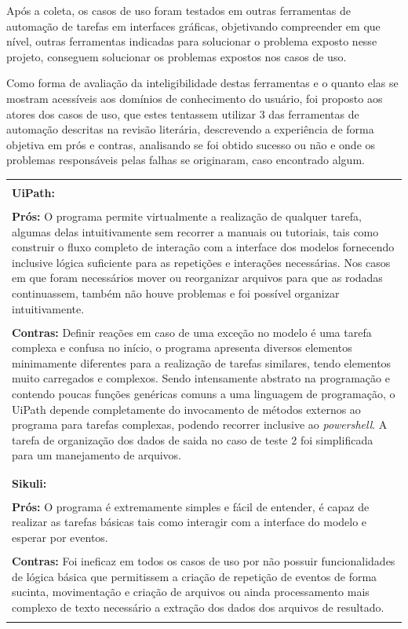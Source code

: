 \documentclass[tg]{mdtufsm}
\begin{document}
	Após a coleta, os casos de uso foram testados em outras ferramentas de automação de tarefas em interfaces gráficas, objetivando compreender em que nível, outras ferramentas indicadas para solucionar o problema exposto nesse projeto, conseguem solucionar os problemas expostos nos casos de uso.
	
	Como forma de avaliação da inteligibilidade destas ferramentas e o quanto elas se mostram acessíveis aos domínios de conhecimento do usuário, foi proposto aos atores dos casos de uso, que estes tentassem utilizar 3 das ferramentas de automação descritas na revisão literária, descrevendo a experiência de forma objetiva em prós e contras, analisando se foi obtido sucesso ou não e onde os problemas responsáveis pelas falhas se originaram, caso encontrado algum. 
	\bigskip
	

		{\centering \begin{tabular}{ | m{15.6cm} | }
		\hline \\
	
		{\bf UiPath:} \\ \\
		{\bf Prós:} O programa permite virtualmente a realização de qualquer tarefa, algumas delas intuitivamente sem recorrer a manuais ou tutoriais, tais como construir o fluxo completo de interação com a interface dos modelos fornecendo inclusive lógica suficiente para as repetições e interações necessárias. Nos casos em que foram necessários mover ou reorganizar arquivos para que as rodadas continuassem, também não houve problemas e foi possível organizar intuitivamente. \\ \\
		{\bf Contras:} Definir reações em caso de uma exceção no modelo é uma tarefa complexa e confusa no início, o programa apresenta diversos elementos minimamente diferentes para a realização de tarefas similares, tendo elementos muito carregados e complexos. Sendo intensamente abstrato na programação e contendo poucas funções genéricas comuns a uma linguagem de programação, o UiPath depende completamente do invocamento de métodos externos ao programa para tarefas complexas, podendo recorrer inclusive ao \emph{powershell}. A tarefa de organização dos dados de saida no caso de teste 2 foi simplificada para um manejamento de arquivos. \\ \\
	
		\hline \hline \\
	
		{\bf Sikuli:} \\ \\
		{\bf Prós:} O programa é extremamente simples e fácil de entender, é capaz de realizar as tarefas básicas tais como interagir com a interface do modelo e esperar por eventos. \\ \\
		{\bf Contras:} Foi ineficaz em todos os casos de uso por não possuir funcionalidades de lógica básica que permitissem a criação de repetição de eventos de forma sucinta, movimentação e criação de arquivos ou ainda processamento mais complexo de texto necessário a extração dos dados dos arquivos de resultado. \\ \\
	

\end{tabular}}
\end{document}
